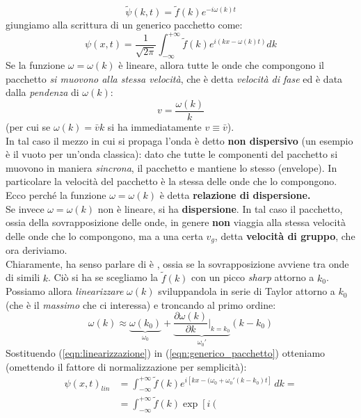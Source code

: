 \documentclass[../../FisicaTeorica.tex]{subfiles}
\begin{document}
\begin{expl}
\[
\tilde{\psi}(k,t)=\tilde{f}(k)e^{-i\omega(k)t}
\]
giungiamo alla scrittura di un generico pacchetto come:
\begin{equation}
\psi(x,t)=\frac{1}{\sqrt{2\pi}}\int_{-\infty}^{+\infty}\tilde{f}(k) e^{i(kx-\omega(k)t)}dk
\label{eqn:generico_pacchetto}
\end{equation}
Se la funzione $\omega=\omega(k)$ è lineare, allora tutte le onde che compongono il pacchetto \textit{si muovono alla stessa velocità}, che è detta \textit{velocità di fase} ed è data dalla \textit{pendenza} di $\omega(k)$:
\[
v=\frac{\omega(k)}{k}
\]
(per cui se $\omega(k)=\bar{v}k$ si ha immediatamente $v\equiv \bar{v}$).\\
In tal caso il mezzo in cui si propaga l'onda è detto \textbf{non dispersivo} (un esempio è il vuoto per un'onda classica): dato che tutte le componenti del pacchetto si muovono in maniera \textit{sincrona}, il pacchetto  e mantiene lo stesso  (envelope). In particolare la velocità del pacchetto è la stessa delle onde che lo compongono. Ecco perché la funzione $\omega = \omega(k)$ è detta \textbf{relazione di dispersione.}\\
Se invece $\omega=\omega(k)$ non è lineare, si ha \textbf{dispersione}. In tal caso il pacchetto, ossia  della sovrapposizione delle onde, in genere \textbf{non} viaggia alla stessa velocità delle onde che lo compongono, ma a una certa $v_g$, detta \textbf{velocità di gruppo}, che ora deriviamo.\\
Chiaramente, ha senso parlare di  è , ossia se la sovrapposizione avviene tra onde di simili $k$. Ciò si ha se scegliamo la $\tilde{f}(k)$ con un picco \textit{sharp} attorno a $k_0$. Possiamo allora \textit{linearizzare} $\omega(k)$ sviluppandola in serie di Taylor attorno a $k_0$ (che è il \textit{massimo} che ci interessa) e troncando al primo ordine:
\begin{equation}
\omega(k)\approx \underbrace{\omega(k_0)}_{\omega_0} + \underbrace{\frac{\partial \omega(k)}{\partial k}\Big|_{k=k_0}}_{\omega_0'}(k-k_0)
\label{eqn:linearizzazione}
\end{equation}
Sostituendo (\ref{eqn:linearizzazione}) in (\ref{eqn:generico_pacchetto}) otteniamo (omettendo il fattore di normalizzazione per semplicità):
\begin{align*}
\psi(x,t)_{lin}&=\int_{-\infty}^{+\infty}\tilde{f}(k)e^{i[kx-(\omega_0+\omega_0'(k-k_0)t]}\,dk=\\
&=\int_{-\infty}^{+\infty}\tilde{f}(k)\exp\left [i\left(

\end{align*}
\end{expl}
\end{document}

